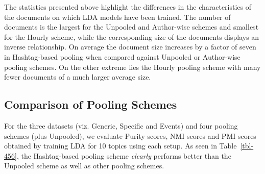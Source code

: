 \documentclass{sig-alternate}
\newcommand{\secmoveup}{\vspace{-1.mm}}
\begin{document}
The statistics presented above highlight the differences in the
characteristics of the documents on which LDA models have been
trained. The number of documents is the largest for the Unpooled
and Author-wise schemes and smallest for the Hourly scheme, while the
corresponding size of the documents displays an inverse relationship.  On 
average the document size increases by a factor of seven in
Hashtag-based pooling when compared against Unpooled or Author-wise
pooling schemes.  On the other extreme lies the Hourly pooling scheme
with many fewer documents of a much larger average size.

\secmoveup
\subsection{Comparison of Pooling Schemes}

For the three datasets (viz. Generic, Specific and Events) and four pooling
schemes (plus Unpooled), we evaluate Purity scores, NMI scores and PMI scores
obtained by training LDA for 10 topics using each setup.
As seen in Table~\ref{tbl-456}, the Hashtag-based pooling scheme
\emph{clearly} performs better than the Unpooled scheme as well as other
pooling schemes.
\end{document}
